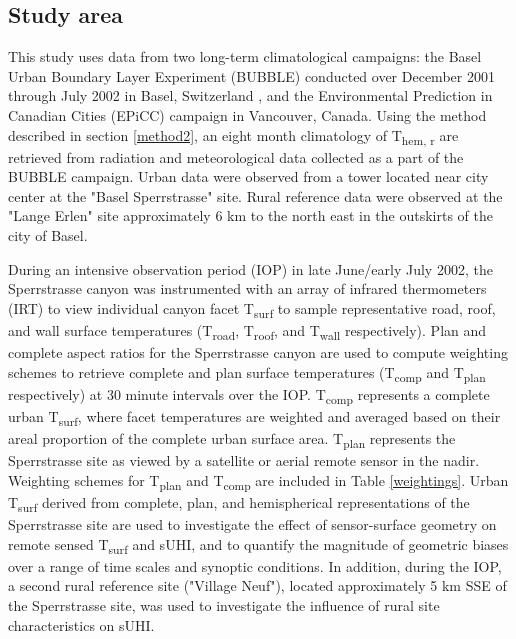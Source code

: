 \begin{bibunit}
\subsection{Study area}

This study uses data from two long-term climatological campaigns: the Basel Urban Boundary Layer Experiment (BUBBLE) conducted over December 2001 through July 2002 in Basel, Switzerland \citep{Rotach2005}, and the Environmental Prediction in Canadian Cities (EPiCC) \citep{Voogt2007} campaign in Vancouver, Canada. Using the method described in section \ref{method2}, an eight month climatology of T\textsubscript{hem, r} are retrieved from radiation and meteorological data collected as a part of the BUBBLE campaign. Urban data were observed from a tower located near city center at the "Basel Sperrstrasse" site. Rural reference data were observed at the "Lange Erlen" site approximately 6 \si{\kilo\meter} to the north east in the outskirts of the city of Basel. 

During an intensive observation period (IOP) in late June/early July 2002, the Sperrstrasse canyon was instrumented with an array of infrared thermometers (IRT) to view individual canyon facet T\textsubscript{surf} to sample representative road, roof, and wall surface temperatures (T\textsubscript{road}, T\textsubscript{roof}, and T\textsubscript{wall} respectively). Plan and complete aspect ratios for the Sperrstrasse canyon are used to compute weighting schemes to retrieve complete and plan surface temperatures (T\textsubscript{comp} and T\textsubscript{plan} respectively) at 30 minute intervals over the IOP. T\textsubscript{comp} represents a complete urban T\textsubscript{surf}, where facet temperatures are weighted and averaged based on their areal proportion of the complete urban surface area. T\textsubscript{plan} represents the Sperrstrasse site as viewed by a satellite or aerial remote sensor in the nadir. Weighting schemes for T\textsubscript{plan} and T\textsubscript{comp} are included in Table \ref{weightings}. Urban T\textsubscript{surf} derived from complete, plan, and hemispherical representations of the Sperrstrasse site are used to investigate the effect of sensor-surface geometry on remote sensed T\textsubscript{surf} and sUHI, and to quantify the magnitude of geometric biases over a range of time scales and synoptic conditions. In addition, during the IOP, a second rural reference site ("Village Neuf"), located approximately 5 \si{\kilo\meter} SSE of the Sperrstrasse site, was used to investigate the influence of rural site characteristics on sUHI. 


\end{bibunit}
